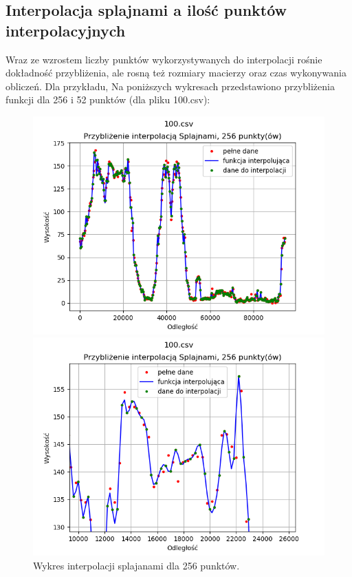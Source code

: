 \documentclass{article} %
\begin{document}
\subsection{Interpolacja splajnami a ilość punktów interpolacyjnych}
Wraz ze wzrostem liczby punktów wykorzystywanych do interpolacji rośnie dokładność 
przybliżenia, ale rosną też rozmiary macierzy oraz czas wykonywania obliczeń. Dla przykładu,
Na poniższych wykresach przedstawiono przybliżenia funkcji dla 256 i 52 punktów (dla pliku 100.csv): \\
\begin{figure}[h!]
    \center
    \begin{minipage}[b]{0.4\textwidth}
        \includegraphics[width=\textwidth]{splajny/rozne_dokladnosci/100_256punktow_cale.png}
        \caption{Wykres interpolacji splajanami dla 256 punktów.}
    \end{minipage}
    \hfill
    \begin{minipage}[b]{0.4\textwidth}
        \includegraphics[width=\textwidth]{splajny/rozne_dokladnosci/100_256_zb.png}

\end{minipage}
\end{figure}
\end{document}
